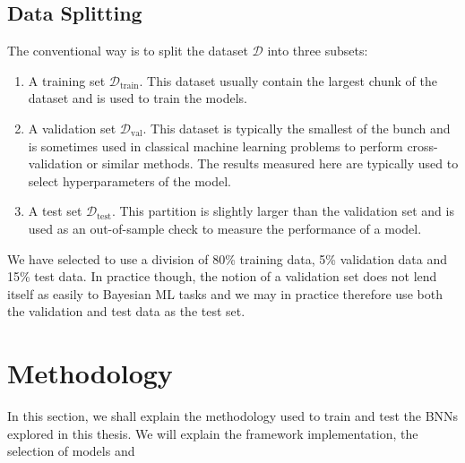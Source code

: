 \subsection{Data Splitting}
The conventional way is to split the dataset $\mathcal{D}$ into three subsets: 
\begin{enumerate}
    \item A training set $\mathcal{D}_\text{train}$. This dataset usually contain the largest chunk of the dataset and is used to train the models.
    \item A validation set $\mathcal{D}_\text{val}$. This dataset is typically the smallest of the bunch and is sometimes used in classical machine learning problems to perform cross-validation or similar methods. The results measured here are typically used to select hyperparameters of the model.
    \item A test set $\mathcal{D}_\text{test}$. This partition is slightly larger than the validation set and is used as an out-of-sample check to measure the performance of a model. 
\end{enumerate}
We have selected to use a division of 80\% training data, 5\% validation data and 15\% test data. In practice though, the notion of a validation set does not lend itself as easily to Bayesian ML tasks and we may in practice therefore use both the validation and test data as the test set.

\section{Methodology}
In this section, we shall explain the methodology used to train and test the BNNs explored in this thesis. We will explain the framework implementation, the selection of models and 

